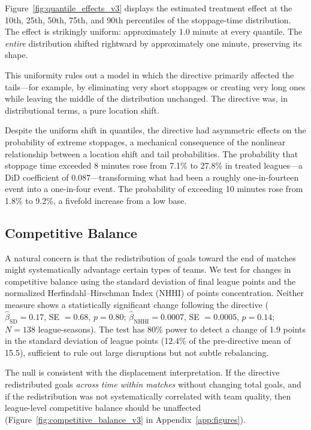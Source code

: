 \documentclass[12pt]{article}
\begin{document}
Figure~\ref{fig:quantile_effects_v3} displays the estimated treatment effect at the 10th, 25th, 50th, 75th, and 90th percentiles of the stoppage-time distribution. The effect is strikingly uniform: approximately 1.0 minute at every quantile. The \emph{entire} distribution shifted rightward by approximately one minute, preserving its shape.

This uniformity rules out a model in which the directive primarily affected the tails---for example, by eliminating very short stoppages or creating very long ones while leaving the middle of the distribution unchanged. The directive was, in distributional terms, a pure location shift.

Despite the uniform shift in quantiles, the directive had asymmetric effects on the probability of extreme stoppages, a mechanical consequence of the nonlinear relationship between a location shift and tail probabilities. The probability that stoppage time exceeded 8 minutes rose from 7.1\% to 27.8\% in treated leagues---a DiD coefficient of $0.087$---transforming what had been a roughly one-in-fourteen event into a one-in-four event. The probability of exceeding 10 minutes rose from 1.8\% to 9.2\%, a fivefold increase from a low base.


\subsection{Competitive Balance}
\label{subsec:competitive_balance}

A natural concern is that the redistribution of goals toward the end of matches might systematically advantage certain types of teams. We test for changes in competitive balance using the standard deviation of final league points and the normalized Herfindahl--Hirschman Index (NHHI) of points concentration. Neither measure shows a statistically significant change following the directive ($\hat{\beta}_{\text{SD}} = 0.17$, SE $= 0.68$, $p = 0.80$; $\hat{\beta}_{\text{NHHI}} = 0.0007$, SE $= 0.0005$, $p = 0.14$; $N = 138$ league-seasons). The test has 80\% power to detect a change of 1.9 points in the standard deviation of league points (12.4\% of the pre-directive mean of 15.5), sufficient to rule out large disruptions but not subtle rebalancing.

The null is consistent with the displacement interpretation. If the directive redistributed goals \emph{across time within matches} without changing total goals, and if the redistribution was not systematically correlated with team quality, then league-level competitive balance should be unaffected (Figure~\ref{fig:competitive_balance_v3} in Appendix~\ref{app:figures}).
\end{document}

